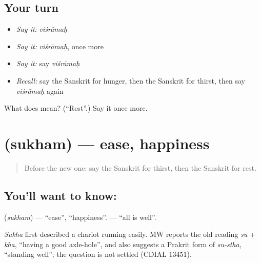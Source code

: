 \subsection*{Your turn}
\begin{itemize}
\raggedright
  \item \emph{Say it:} \emph{viśrāmaḥ}
  \item \emph{Say it:} \emph{viśrāmaḥ}, once more
  \item \emph{Say it:} say \emph{viśrāmaḥ}
  \item \emph{Recall:} say the Sanskrit for hunger, then the Sanskrit for thirst, then say \emph{viśrāmaḥ} again
\end{itemize}

\begin{tcolorbox}[breakable,colback=teal!4,colframe=teal!35!black,title={Before you move on}]
What does  mean? (\textquotedblleft{}Rest\textquotedblright{}.) Say it once more.
\end{tcolorbox}
\section[\texorpdfstring{\sk{सुखम्} (sukham)}{सुखम् (sukham)}]{ (sukham) — ease, happiness}

\label{lesson:SA-C67-ease}



\begin{quote}
Before the new one: say the Sanskrit for thirst, then the Sanskrit for rest.
\end{quote}

\subsection*{You'll want to know: }
\textbf{} (\emph{sukham}) — \textquotedblleft{}ease\textquotedblright{}, \textquotedblleft{}happiness\textquotedblright{}. \textbf{ } — \textquotedblleft{}all is well\textquotedblright{}.

\begin{cousinweb}
\emph{Sukha} first described a chariot running easily. MW reports the old reading \emph{su} + \emph{kha}, \textquotedblleft{}having a good axle-hole\textquotedblright{}, and also suggests a Prakrit form of \emph{su-stha}, \textquotedblleft{}standing well\textquotedblright{}; the question is not settled (CDIAL 13451).
\end{cousinweb}

